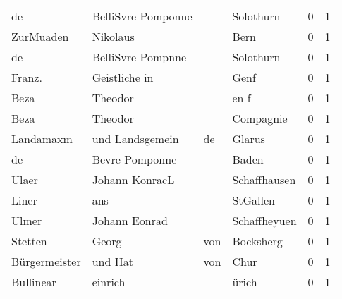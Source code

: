 \begin{center}
\begin{tiny}
\begin{longtabu}{llllrr}
                       de &                 BelliSvre Pomponne &             &                                   Solothurn &          0 &         1 \\
                ZurMuaden &                           Nikolaus &             &                                        Bern &          0 &         1 \\
                       de &                  BelliSvre Pompnne &             &                                   Solothurn &          0 &         1 \\
                   Franz. &                      Geistliche in &             &                                        Genf &          0 &         1 \\
                     Beza &                            Theodor &             &                                        en f &          0 &         1 \\
                     Beza &                            Theodor &             &                                   Compagnie &          0 &         1 \\
                Landamaxm &                    und Landsgemein &          de &                                      Glarus &          0 &         1 \\
                       de &                     Bevre Pomponne &             &                                       Baden &          0 &         1 \\
                    Ulaer &                     Johann KonracL &             &                                Schaffhausen &          0 &         1 \\
                    Liner &                                ans &             &                                    StGallen &          0 &         1 \\
                    Ulmer &                      Johann Eonrad &             &                                Schaffheyuen &          0 &         1 \\
                  Stetten &                              Georg &         von &                                   Bocksherg &          0 &         1 \\
            Bürgermeister &                            und Hat &         von &                                        Chur &          0 &         1 \\
                Bullinear &                            einrich &             &                                       ürich &          0 &         1 \\

\end{longtabu}
\end{tiny}
\end{center}
